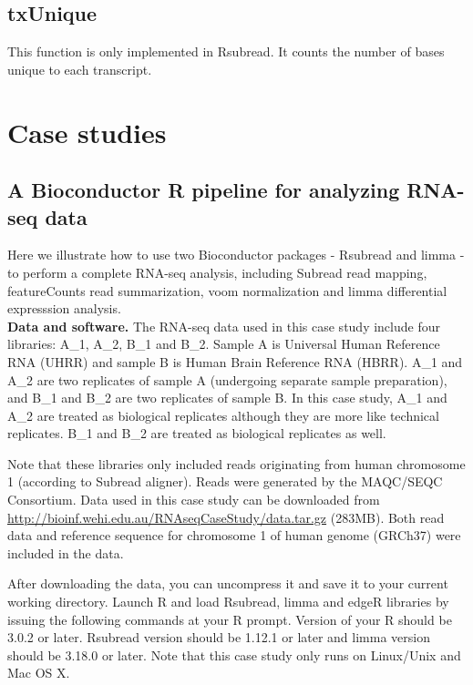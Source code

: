 \documentclass[12pt]{report}
\newcommand{\Subread}{\textsf{Subread}}
\newcommand{\Rsubread}{\textsf{Rsubread}}
\newcommand{\limma}{\textsf{limma}}
\newcommand{\edgeR}{\textsf{edgeR}}
\newcommand{\voom}{\textsf{voom}}
\newcommand{\featureCounts}{\textsf{featureCounts}}
\newcommand{\R}{\textsf{R}}
\begin{document}
\section{txUnique}

This function is only implemented in {\Rsubread}. It counts the number of bases unique to each transcript.

\chapter{Case studies}

\section{A Bioconductor R pipeline for analyzing RNA-seq data}

Here we illustrate how to use two Bioconductor packages - {\Rsubread} and {\limma} - to perform a complete RNA-seq analysis, including {\Subread} read mapping, {\featureCounts} read summarization, {\voom} normalization and {\limma} differential expresssion analysis.\\

{\noindent\bf Data and software.} The RNA-seq data used in this case study include four libraries: A\_1, A\_2, B\_1 and B\_2.
Sample A is Universal Human Reference RNA (UHRR) and sample B is Human Brain Reference RNA (HBRR).
A\_1 and A\_2 are two replicates of sample A (undergoing separate sample preparation), and B\_1 and B\_2 are two replicates of sample B.
In this case study, A\_1 and A\_2 are treated as biological replicates although they are more like technical replicates.
B\_1 and B\_2 are treated as biological replicates as well.

Note that these libraries only included reads originating from human chromosome 1 (according to {\Subread} aligner).
Reads were generated by the MAQC/SEQC Consortium.
Data used in this case study can be downloaded from\\
\url{http://bioinf.wehi.edu.au/RNAseqCaseStudy/data.tar.gz} (283MB).
Both read data and reference sequence for chromosome 1 of human genome (GRCh37) were included in the data.

After downloading the data, you can uncompress it and save it to your current working directory.
Launch {\R} and load {\Rsubread}, {\limma} and {\edgeR} libraries by issuing the following commands at your R prompt.
Version of your {\R} should be 3.0.2 or later.
{\Rsubread} version should be 1.12.1 or later and {\limma} version should be 3.18.0 or later.
Note that this case study only runs on Linux/Unix and Mac OS X.
\end{document}
